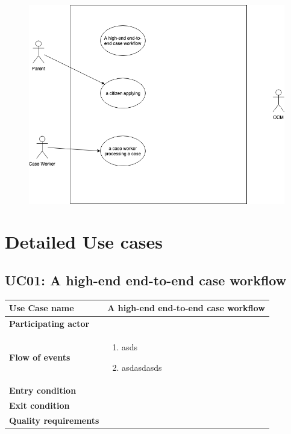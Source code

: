 \documentclass{article}
\begin{document}
\begin{figure}[htb!]
	\includegraphics[width=\textwidth]{img/use-cases}
\end{figure}


\section{Detailed Use cases}

\subsection{UC01: A high-end end-to-end case workflow}

\begin{tabularx}{\textwidth}{l|l}
	\textbf{Use Case name} & A high-end end-to-end case workflow \\
	\hline
	\textbf{Participating actor} & \\
	\hline
	\textbf{Flow of events} &
	\begin{minipage}{\linewidth}
		\begin{enumerate}
			\item asds
			\item asdasdasds
		\end{enumerate} 
	\end{minipage}\\
	\hline
	\textbf{Entry condition} & \\
	\hline
	\textbf{Exit condition} & \\
	\hline
	\textbf{Quality requirements} & \\
\end{tabularx}
\end{document}
